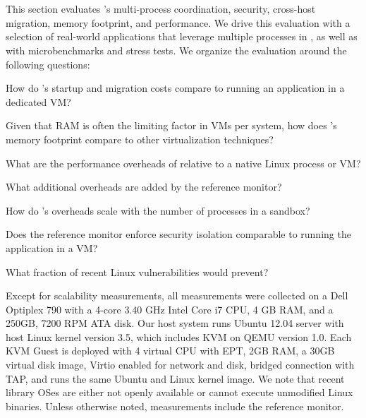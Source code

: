 \section{\graphene{}}
\label{sec:graphene:eval}



This section evaluates \graphene{}'s multi-process coordination, security, cross-host migration, memory footprint, and performance.
We drive this evaluation with a selection of real-world applications that leverage multiple processes in \graphene{},
as well as with microbenchmarks and stress tests.
We organize the evaluation around the following questions:
\begin{compactenum}
\item How do \graphene{}'s startup and migration costs compare to running an application in a dedicated VM?
\item Given that RAM is often the limiting factor in VMs per system, how does \graphene{}'s memory footprint compare to other virtualization techniques?
\item What are the performance overheads of \graphene{} relative to a native Linux process or VM?
\item What additional overheads are added by the reference monitor?
\item How do \graphene{}'s overheads scale with the number of processes in a sandbox?
\item Does the \graphene{} reference monitor enforce security isolation comparable to running the application in a VM?  
\item What fraction of recent Linux vulnerabilities would \graphene{} prevent?
\end{compactenum}


Except for scalability measurements, 
all measurements were collected on a 
Dell Optiplex 790 with 
a 4-core 3.40 GHz Intel Core i7 CPU,
4 GB RAM, and a 250GB, 7200 RPM ATA disk.
Our host system runs Ubuntu 12.04 server with host Linux kernel version 3.5, 
which includes KVM on 
QEMU version 1.0.
Each KVM Guest is deployed with 4 virtual CPU with EPT, 2GB RAM, a 30GB virtual disk image, Virtio enabled for network and disk, bridged connection with TAP, and runs the same Ubuntu and Linux kernel image.
We note that recent library OSes are either not openly available
or cannot execute unmodified Linux binaries.
Unless otherwise noted, \graphene{} measurements include the reference monitor.

